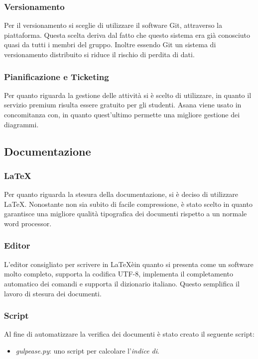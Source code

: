 \subsubsection{Versionamento}
Per il versionamento si sceglie di utilizzare il software Git, attraverso la piattaforma. Questa scelta deriva dal fatto che questo sistema era già conosciuto quasi da tutti i membri del gruppo. Inoltre essendo Git un sistema di versionamento distribuito si riduce il rischio di perdita di dati. 
\subsubsection{Pianificazione e Ticketing}
Per quanto riguarda la gestione delle attività si è scelto di utilizzare, in quanto il servizio premium risulta essere gratuito per gli studenti. Asana viene usato in concomitanza con, in quanto quest'ultimo permette una migliore gestione dei diagrammi.
\subsection{Documentazione}
\subsubsection{\LaTeX}
Per quanto riguarda la stesura della documentazione, si è deciso di utilizzare \LaTeX. Nonostante non sia subito di facile compressione, è stato scelto in quanto garantisce una migliore qualità tipografica dei documenti rispetto a un normale word processor.
\subsubsection{Editor}
 L'editor consigliato per scrivere in \LaTeX èin quanto si presenta come un software molto completo, supporta la codifica UTF-8, implementa il completamento automatico dei comandi e supporta il dizionario italiano. Questo semplifica il lavoro di stesura dei documenti.
 \subsubsection{Script}
Al fine di automatizzare la verifica dei documenti è stato creato il seguente script:
\begin{itemize}
	\item \textit{gulpease.py}: uno script per calcolare l'\textit{indice di}.
\end{itemize} 

